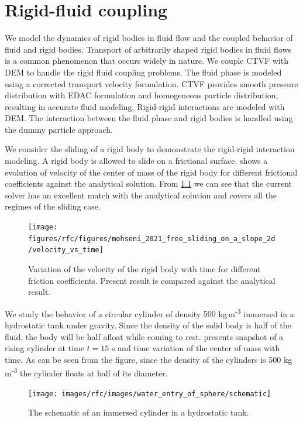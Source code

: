 \chapter{Rigid-fluid coupling}
\label{chap:rfc}
We model the dynamics of rigid bodies in fluid flow and the coupled behavior of
fluid and rigid bodies. Transport of arbitrarily shaped rigid bodies in fluid
flows is a common phenomenon that occurs widely in nature. We couple CTVF with
DEM to handle the rigid fluid coupling problems. The fluid phase is modeled
using a corrected transport velocity formulation. CTVF provides smooth pressure
distribution with EDAC formulation and homogeneous particle distribution,
resulting in accurate fluid modeling. Rigid-rigid interactions are modeled with
DEM. The interaction between the fluid phase and rigid bodies is handled using
the dummy particle approach.

We consider the sliding of a rigid body to demonstrate the rigid-rigid interaction
modeling. A rigid body is allowed to slide on a frictional surface.
 shows a evolution of
velocity of the center of mass of the rigid body for different frictional
coefficients against the analytical solution. From
\cref{fig:results-solid-sliding-velocity-vs-time-2d} we can see that the current
solver has an excellent match with the analytical solution and covers all the
regimes of the sliding case.
\begin{figure}[tpb]
  \centering
  \texttt{[image: figures/rfc/figures/mohseni\_2021\_free\_sliding\_on\_a\_slope\_2d/velocity\_vs\_time]}
  \caption{Variation of the velocity of the rigid body with time for different
    friction coefficients. Present result is compared against the analytical
    result.}
\label{fig:results-solid-sliding-velocity-vs-time-2d}
\end{figure}


We study the behavior of a circular cylinder of density $500$
kg\,m\textsuperscript{-3} immersed in a hydrostatic tank under gravity. Since
the density of the solid body is half of the fluid, the body will be half afloat
while coming to rest.  presents
snapshot of a rising cylinder at time $t=15$ s and time variation of the center
of mass with time. As can be seen from the figure, since the density of the
cylinders is 500 kg\,m\textsuperscript{-3} the cylinder floats at half of its
diameter.
\begin{figure}[tpb]
  \centering
    \texttt{[image: images/rfc/images/water\_entry\_of\_sphere/schematic]}
  \caption{The schematic of an immersed cylinder in a hydrostatic tank.}
\label{fig:raising-falling-solid-in-water}
\end{figure}

